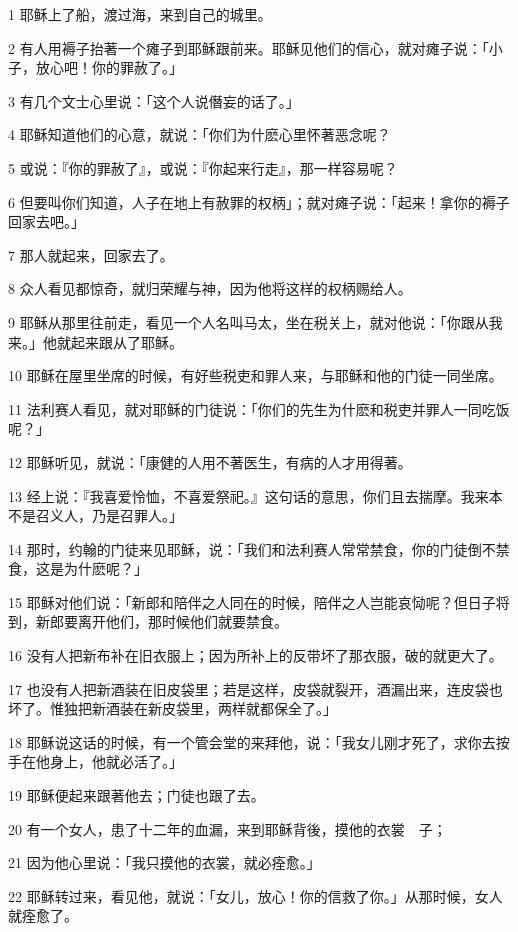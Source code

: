 \par 1 耶稣上了船，渡过海，来到自己的城里。
\par 2 有人用褥子抬著一个瘫子到耶稣跟前来。耶稣见他们的信心，就对瘫子说：「小子，放心吧！你的罪赦了。」
\par 3 有几个文士心里说：「这个人说僭妄的话了。」
\par 4 耶稣知道他们的心意，就说：「你们为什麽心里怀著恶念呢？
\par 5 或说：『你的罪赦了』，或说：『你起来行走』，那一样容易呢？
\par 6 但要叫你们知道，人子在地上有赦罪的权柄」；就对瘫子说：「起来！拿你的褥子回家去吧。」
\par 7 那人就起来，回家去了。
\par 8 众人看见都惊奇，就归荣耀与神，因为他将这样的权柄赐给人。
\par 9 耶稣从那里往前走，看见一个人名叫马太，坐在税关上，就对他说：「你跟从我来。」他就起来跟从了耶稣。
\par 10 耶稣在屋里坐席的时候，有好些税吏和罪人来，与耶稣和他的门徒一同坐席。
\par 11 法利赛人看见，就对耶稣的门徒说：「你们的先生为什麽和税吏并罪人一同吃饭呢？」
\par 12 耶稣听见，就说：「康健的人用不著医生，有病的人才用得著。
\par 13 经上说：『我喜爱怜恤，不喜爱祭祀。』这句话的意思，你们且去揣摩。我来本不是召义人，乃是召罪人。」
\par 14 那时，约翰的门徒来见耶稣，说：「我们和法利赛人常常禁食，你的门徒倒不禁食，这是为什麽呢？」
\par 15 耶稣对他们说：「新郎和陪伴之人同在的时候，陪伴之人岂能哀恸呢？但日子将到，新郎要离开他们，那时候他们就要禁食。
\par 16 没有人把新布补在旧衣服上；因为所补上的反带坏了那衣服，破的就更大了。
\par 17 也没有人把新酒装在旧皮袋里；若是这样，皮袋就裂开，酒漏出来，连皮袋也坏了。惟独把新酒装在新皮袋里，两样就都保全了。」
\par 18 耶稣说这话的时候，有一个管会堂的来拜他，说：「我女儿刚才死了，求你去按手在他身上，他就必活了。」
\par 19 耶稣便起来跟著他去；门徒也跟了去。
\par 20 有一个女人，患了十二年的血漏，来到耶稣背後，摸他的衣裳　子；
\par 21 因为他心里说：「我只摸他的衣裳，就必痊愈。」
\par 22 耶稣转过来，看见他，就说：「女儿，放心！你的信救了你。」从那时候，女人就痊愈了。
